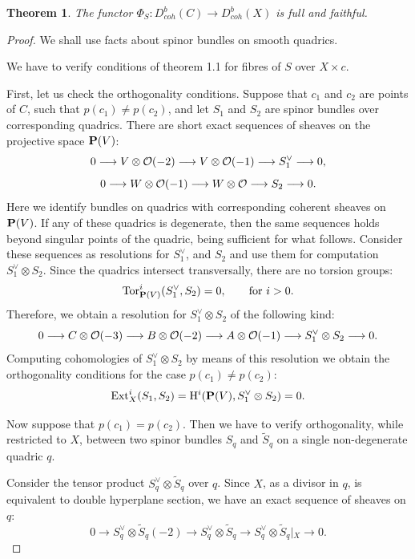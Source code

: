 \documentclass[12pt]{article}
\newtheorem{theorem}{Theorem}[section]
\begin{document}
\begin{theorem}\label{iq} The functor $\Phi_S:D_{coh}^b(C)\longrightarrow D_{coh}^b(X)$ is full and faithful.
\end{theorem}
\begin{proof}
We shall use facts about spinor bundles on smooth quadrics.

We have to verify conditions of theorem 1.1 for fibres of $S$ over $X\times c$.

First, let us check the orthogonality conditions. Suppose that $c_1$ and $c_2$ are points of $C$, such that $p(c_1)\not=p(c_2)$, and let $S_1$ and $S_2$ are spinor bundles over corresponding quadrics. There are short exact sequences of sheaves on the projective space ${\bf P}(V)$:
$$
0\longrightarrow V\otimes{\cal O}(-2)\longrightarrow 
V\otimes{\cal O}(-1)\longrightarrow S^{\vee}_1\longrightarrow 0,
$$
$$
0\longrightarrow W\otimes{\cal O}(-1)\longrightarrow W\otimes {\cal O}\longrightarrow S_2 \longrightarrow 0.
$$
Here we identify bundles on quadrics with corresponding coherent sheaves on ${\bf P}(V)$. If any of these quadrics is degenerate, then the same sequences holds beyond singular points  of the quadric, being sufficient for what follows. Consider these sequences as resolutions for $S^{\vee}_1$, and $S_2$ and use them for computation $S_1^{\vee}\otimes S_2$. Since the quadrics intersect transversally, there are no torsion groups:
$$
{\rm Tor}^i_{{\bf P}(V)}(S_1^{\vee},S_2)=0,\qquad{\rm for}\ i>0.
$$
Therefore, we obtain a resolution for $S_1^{\vee}\otimes S_2$ of the following kind:
$$
0\longrightarrow C\otimes {\cal O}(-3)\longrightarrow 
 B\otimes {\cal O}(-2)\longrightarrow 
 A\otimes {\cal O}(-1)\longrightarrow S_1^{\vee}\otimes S_2\longrightarrow 0.
$$
Computing cohomologies of $S_1^{\vee}\otimes S_2$ by means of this resolution we obtain the orthogonality conditions for the case $p(c_1)\not=p(c_2):$
$$
{\rm Ext}^i_X(S_1,S_2)={\rm H}^i({\bf P}(V),S_1^{\vee}\otimes S_2)=0.
$$

Now suppose that $p(c_1)=p(c_2)$. Then we have to verify orthogonality, while restricted to $X$, between two spinor bundles $S_q$ and $\widetilde S_q$ on a single non-degenerate quadric $q$.

Consider the tensor product $S_q^{\vee}\otimes\widetilde S_q$ over $q$. Since $X$, as a divisor in $q$, is equivalent to double hyperplane section, we have an exact sequence of sheaves on $q$:
$$
0\longrightarrow S_q^{\vee}\otimes\widetilde S_q(-2)\longrightarrow
S_q^{\vee}\otimes\widetilde S_q \longrightarrow
S_q^{\vee}\otimes\widetilde S_q \left|_X\right. \longrightarrow 0.
$$


\end{proof}
\end{document}
